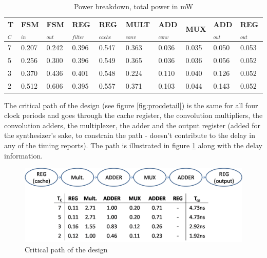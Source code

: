 \documentclass[11pt,a4paper]{article}
\begin{document}
\begin{table}[h]
	\caption{Power breakdown, total power in mW}
	\begin{center}
		\begin{tabular}{|p{0.4cm}|p{1.15cm}|p{1.25cm}|p{1.5cm}|p{1.55cm}|p{1.75cm}|p{1.45cm}|p{1cm}|p{1.3cm}|p{1.25cm}|} \hline
			\textbf{T}$_{C}$ & \textbf{FSM}$_{in}$ & \textbf{FSM}$_{out}$ & \textbf{REG}$_{filter}$ & \textbf{REG}$_{cache}$ & \textbf{MULT}$_{conv}$ & \textbf{ADD}$_{conv}$ & \textbf{MUX} & \textbf{ADD}$_{out}$ & \textbf{REG}$_{out}$ \\ \hline
			7 & 0.207 & 0.242 & 0.396 & 0.547 & 0.363 & 0.036 & 0.035 & 0.050 & 0.053 \\ \hline
			5 & 0.256 & 0.300 & 0.396 & 0.549 & 0.365 & 0.036 & 0.036 & 0.056 & 0.052 \\ \hline 
			3 & 0.370 & 0.436 & 0.401 & 0.548 & 0.224 & 0.110 & 0.040 & 0.126 & 0.052 \\ \hline
			2 & 0.512 & 0.606 & 0.395 & 0.557 & 0.371 & 0.103 & 0.044 & 0.143 & 0.052 \\ \hline
		\end{tabular}
	\end{center}
	\label{tab:broken}
\end{table}

The critical path of the design (see figure \ref{fig:procdetail}) is the same for all four clock periods and goes through the cache register, the convolution multipliers, the convolution adders, the multiplexer, the adder and the output register (added for the synthesizer's sake, to constrain the path - doesn't contribute to the delay in any of the timing reports). The path is illustrated in figure \ref{fig:critical} along with the delay information.

\begin{figure}[h]
	\centering
		\includegraphics[width=6in]{./images/criticalpath.PNG}
	\caption{Critical path of the design}	\label{fig:critical}
\end{figure}

\FloatBarrier
\end{document}
